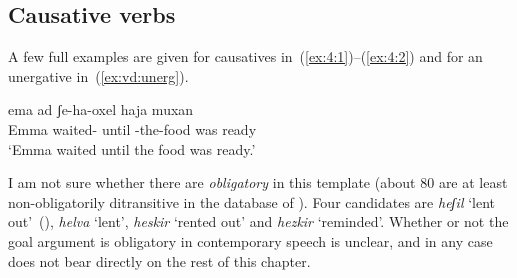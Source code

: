 	\subsection{Causative verbs} \label{vd:thif:caus}
A few full examples are given for causatives in~(\ref{ex:4:1})--(\ref{ex:4:2}) and for an unergative in~(\ref{ex:vd:unerg}).
 \begin{exe}
 \ex  \label{ex:4:1}
 \begin{xlist} 
	
	
 \z
 \ex  \label{ex:4:2}
 \begin{xlist} 
	
	 
 \z
\ex  \label{ex:vd:unerg}  
 	{ \gll ema  ad ʃe-ha-oxel haja muxan\\
 	  Emma waited- until -the-food was ready\\
 	\glt `Emma waited until the food was ready.' } 
	
 \z 

I am not sure whether there are \emph{obligatory}  in this template (about 80 are at least non-obligatorily ditransitive in the database of \citealt{ahdout19phd}). Four candidates are \emph{heʃil} `lent out'~(\nextx), \emph{helva} `lent',  \emph{heskir} `rented out' and \emph{hezkir} `reminded'. Whether or not the goal argument is obligatory in contemporary speech is unclear, and in any case does not bear directly on the rest of this chapter.
 \begin{exe}
		

\end{exe}
\end{xlist}
\end{xlist}
\end{exe}

